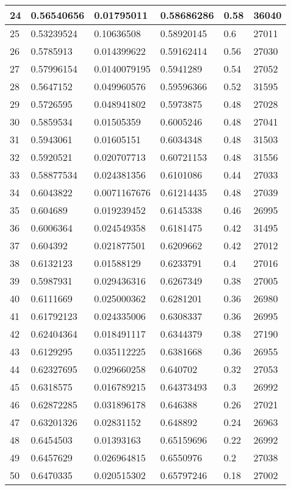 \begin{longtable}{|l|l|l|l|l|l|}
24 & 0.56540656 & 0.01795011 & 0.58686286 & 0.58 & 36040 \\ \hline 
25 & 0.53239524 & 0.10636508 & 0.58920145 & 0.6 & 27011 \\ \hline 
26 & 0.5785913 & 0.014399622 & 0.59162414 & 0.56 & 27030 \\ \hline 
27 & 0.57996154 & 0.0140079195 & 0.5941289 & 0.54 & 27052 \\ \hline 
28 & 0.5647152 & 0.049960576 & 0.59596366 & 0.52 & 31595 \\ \hline 
29 & 0.5726595 & 0.048941802 & 0.5973875 & 0.48 & 27028 \\ \hline 
30 & 0.5859534 & 0.01505359 & 0.6005246 & 0.48 & 27041 \\ \hline 
31 & 0.5943061 & 0.01605151 & 0.6034348 & 0.48 & 31503 \\ \hline 
32 & 0.5920521 & 0.020707713 & 0.60721153 & 0.48 & 31556 \\ \hline 
33 & 0.58877534 & 0.024381356 & 0.6101086 & 0.44 & 27033 \\ \hline 
34 & 0.6043822 & 0.0071167676 & 0.61214435 & 0.48 & 27039 \\ \hline 
35 & 0.604689 & 0.019239452 & 0.6145338 & 0.46 & 26995 \\ \hline 
36 & 0.6006364 & 0.024549358 & 0.6181475 & 0.42 & 31495 \\ \hline 
37 & 0.604392 & 0.021877501 & 0.6209662 & 0.42 & 27012 \\ \hline 
38 & 0.6132123 & 0.01588129 & 0.6233791 & 0.4 & 27016 \\ \hline 
39 & 0.5987931 & 0.029436316 & 0.6267349 & 0.38 & 27005 \\ \hline 
40 & 0.6111669 & 0.025000362 & 0.6281201 & 0.36 & 26980 \\ \hline 
41 & 0.61792123 & 0.024335006 & 0.6308337 & 0.36 & 26995 \\ \hline 
42 & 0.62404364 & 0.018491117 & 0.6344379 & 0.38 & 27190 \\ \hline 
43 & 0.6129295 & 0.035112225 & 0.6381668 & 0.36 & 26955 \\ \hline 
44 & 0.62327695 & 0.029660258 & 0.640702 & 0.32 & 27053 \\ \hline 
45 & 0.6318575 & 0.016789215 & 0.64373493 & 0.3 & 26992 \\ \hline 
46 & 0.62872285 & 0.031896178 & 0.646388 & 0.26 & 27021 \\ \hline 
47 & 0.63201326 & 0.02831152 & 0.648892 & 0.24 & 26963 \\ \hline 
48 & 0.6454503 & 0.01393163 & 0.65159696 & 0.22 & 26992 \\ \hline 
49 & 0.6457629 & 0.026964815 & 0.6550976 & 0.2 & 27038 \\ \hline 
50 & 0.6470335 & 0.020515302 & 0.65797246 & 0.18 & 27002 \\ \hline 
\end{longtable}